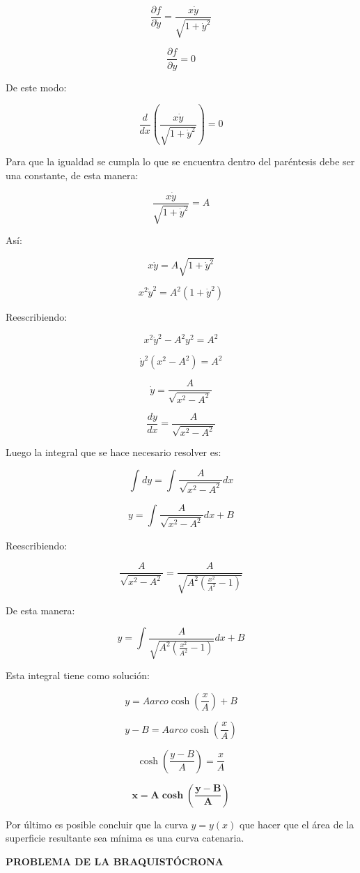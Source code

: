 \documentclass[]{article}
\begin{document}
\[\frac{\partial f}{\partial\dot{y}} = \frac{x\dot{y}}{\sqrt{1 + {\dot{y}}^{2}}}\]

\[\frac{\partial f}{\partial y} = 0\]

De este modo:

\[\frac{d}{dx}\left( \frac{x\dot{y}}{\sqrt{1 + {\dot{y}}^{2}}} \right) = 0\]

Para que la igualdad se cumpla lo que se encuentra dentro del paréntesis
debe ser una constante, de esta manera:

\[\frac{x\dot{y}}{\sqrt{1 + {\dot{y}}^{2}}} = A\]

Así:

\[x\dot{y} = A\sqrt{1 + {\dot{y}}^{2}}\]

\[x^{2}{\dot{y}}^{2} = A^{2}\left( 1 + {\dot{y}}^{2} \right)\]

Reescribiendo:

\[x^{2}{\dot{y}}^{2} - A^{2}y^{2} = A^{2}\]

\[{\dot{y}}^{2}\left( x^{2} - A^{2} \right) = A^{2}\]

\[\dot{y} = \frac{A}{\sqrt{x^{2} - A^{2}}}\]

\[\frac{dy}{dx} = \frac{A}{\sqrt{x^{2} - A^{2}}}\]

Luego la integral que se hace necesario resolver es:

\[\int_{}^{}{dy} = \int_{}^{}\frac{A}{\sqrt{x^{2} - A^{2}}}dx\]

\[y = \int_{}^{}\frac{A}{\sqrt{x^{2} - A^{2}}}dx + B\]

Reescribiendo:

\[\frac{A}{\sqrt{x^{2} - A^{2}}} = \frac{A}{\sqrt{A^{2}\left( \frac{x^{2}}{A^{2}} - 1 \right)}}\]

De esta manera:

\[y = \int_{}^{}\frac{A}{\sqrt{A^{2}\left( \frac{x^{2}}{A^{2}} - 1 \right)}}dx + B\]

Esta integral tiene como solución:

\[y = Aarco\cosh\left( \frac{x}{A} \right) + B\]

\[y - B = Aarco\cosh\left( \frac{x}{A} \right)\]

\[\cosh\left( \frac{y - B}{A} \right) = \frac{x}{A}\]

\[\mathbf{x = A}\mathbf{\cosh}\left( \frac{\mathbf{y - B}}{\mathbf{A}} \right)\]

Por último es posible concluir que la curva \(y = y(x)\) que hacer que
el área de la superficie resultante sea mínima es una curva catenaria.

\textbf{PROBLEMA DE LA BRAQUISTÓCRONA}
\end{document}
